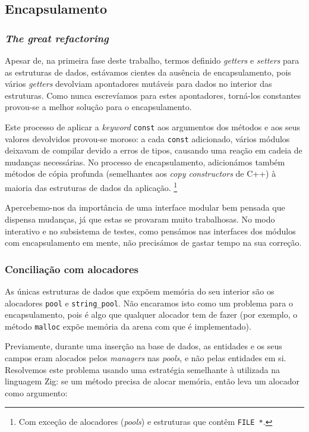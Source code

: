 \documentclass[11pt, a4paper]{article}
\begin{document}
\subsection{Encapsulamento}
\label{sec:encapsulation}

\subsubsection{\emph{The great refactoring}}
\label{sec:the-great-refactoring}

Apesar de, na primeira fase deste trabalho, termos definido \emph{getters} e \emph{setters} para as
estruturas de dados, estávamos cientes da ausência de encapsulamento, pois vários \emph{getters}
devolviam apontadores mutáveis para dados no interior das estruturas. Como nunca escrevíamos para
estes apontadores, torná-los constantes provou-se a melhor solução para o encapsulamento.

Este processo de aplicar a \emph{keyword} \texttt{const} aos argumentos dos métodos e aos seus
valores devolvidos provou-se moroso: a cada \texttt{const} adicionado, vários módulos deixavam de
compilar devido a erros de tipos, causando uma reação em cadeia de mudanças necessárias. No processo
de encapsulamento, adicionámos também métodos de cópia profunda (semelhantes aos \emph{copy
constructors} de C++) à maioria das estruturas de dados da aplicação. \footnote{Com exceção de
alocadores (\emph{pools}) e estruturas que contêm \texttt{FILE *}.}

Apercebemo-nos da importância de uma interface modular bem pensada que dispensa mudanças, já que
estas se provaram muito trabalhosas. No modo interativo e no subsistema de testes, como pensámos nas
interfaces dos módulos com encapsulamento em mente, não precisámos de gastar tempo na sua correção.

\subsubsection{Conciliação com alocadores}
\label{sec:allocator-conciliation}

As únicas estruturas de dados que expõem memória do seu interior são os alocadores \texttt{pool} e
\texttt{string\_pool}. Não encaramos isto como um problema para o encapsulamento, pois é algo que
qualquer alocador tem de fazer (por exemplo, o método \texttt{malloc} expõe memória da arena com
que é implementado).

Previamente, durante uma inserção na base de dados, as entidades e os seus campos eram alocados
pelos \emph{managers} nas \emph{pools}, e não pelas entidades em si. Resolvemos este problema usando
uma estratégia semelhante à utilizada na linguagem Zig: se um método precisa de alocar memória,
então leva um alocador como argumento:
\end{document}
